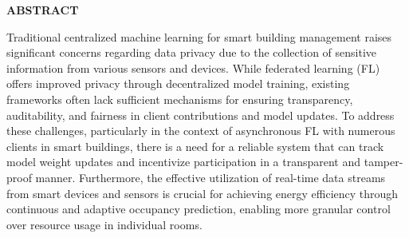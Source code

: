 \documentclass[12pt,a4wide]{report}
\theoremstyle{plain}
\theoremstyle{definition}
\theoremstyle{remark}
\begin{document}
\clearpage






\begin{center}
{\Large{\bf{ABSTRACT}}}
\end{center}

Traditional centralized machine learning for smart building management raises significant concerns regarding data privacy due to the collection of sensitive information from various sensors and devices. While federated learning (FL) offers improved privacy through decentralized model training, existing frameworks often lack sufficient mechanisms for ensuring transparency, auditability, and fairness in client contributions and model updates. To address these challenges, particularly in the context of asynchronous FL with numerous clients in smart buildings, there is a need for a reliable system that can track model weight updates and incentivize participation in a transparent and tamper-proof manner. Furthermore, the effective utilization of real-time data streams from smart devices and sensors is crucial for achieving energy efficiency through continuous and adaptive occupancy prediction, enabling more granular control over resource usage in individual rooms.

\clearpage



\tableofcontents
\clearpage
\listoffigures
\listoftables


\newpage

\setcounter{page}{1}















\end{document}
